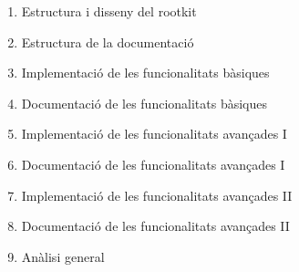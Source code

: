 \begin{enumerate}
    \item Estructura i disseny del rootkit
    \item Estructura de la documentació
    \item Implementació de les funcionalitats bàsiques
    \item Documentació de les funcionalitats bàsiques
    \item Implementació de les funcionalitats avançades I
    \item Documentació de les funcionalitats avançades I
    \item Implementació de les funcionalitats avançades II
    \item Documentació de les funcionalitats avançades II
    \item Anàlisi general
\end{enumerate}


